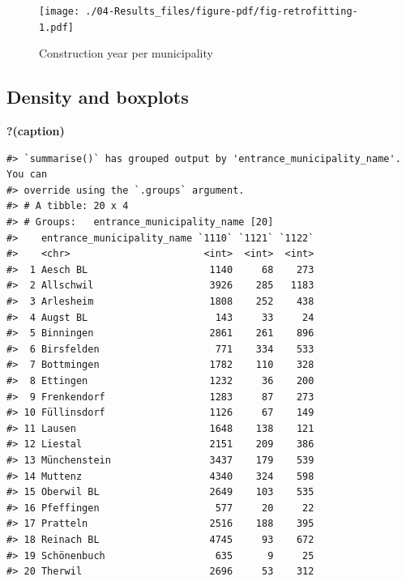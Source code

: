 \documentclass[
  letterpaper,
  DIV=11,
  numbers=noendperiod]{scrreprt}
\begin{document}
\begin{figure}

{\centering \texttt{[image: ./04-Results\_files/figure-pdf/fig-retrofitting-1.pdf]}

}

\caption{\label{fig-retrofitting}Construction year per municipality}

\end{figure}

\hypertarget{density-and-boxplots}{%
\subsection{Density and boxplots}\label{density-and-boxplots}}

\begin{table}

\caption{\textbf{?(caption)}}\begin{minipage}[t]{\linewidth}

{\centering 

\begin{verbatim}
#> `summarise()` has grouped output by 'entrance_municipality_name'. You can
#> override using the `.groups` argument.
#> # A tibble: 20 x 4
#> # Groups:   entrance_municipality_name [20]
#>    entrance_municipality_name `1110` `1121` `1122`
#>    <chr>                       <int>  <int>  <int>
#>  1 Aesch BL                     1140     68    273
#>  2 Allschwil                    3926    285   1183
#>  3 Arlesheim                    1808    252    438
#>  4 Augst BL                      143     33     24
#>  5 Binningen                    2861    261    896
#>  6 Birsfelden                    771    334    533
#>  7 Bottmingen                   1782    110    328
#>  8 Ettingen                     1232     36    200
#>  9 Frenkendorf                  1283     87    273
#> 10 Füllinsdorf                  1126     67    149
#> 11 Lausen                       1648    138    121
#> 12 Liestal                      2151    209    386
#> 13 Münchenstein                 3437    179    539
#> 14 Muttenz                      4340    324    598
#> 15 Oberwil BL                   2649    103    535
#> 16 Pfeffingen                    577     20     22
#> 17 Pratteln                     2516    188    395
#> 18 Reinach BL                   4745     93    672
#> 19 Schönenbuch                   635      9     25
#> 20 Therwil                      2696     53    312
\end{verbatim}

}

\end{minipage}%

\end{table}
\end{document}
